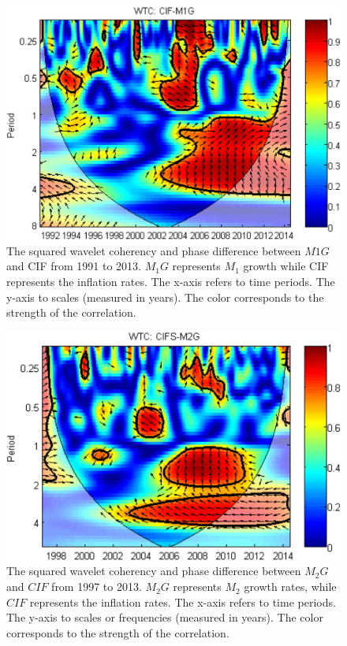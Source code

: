 \documentclass[a4paper,fleqn]{cas-sc}
\begin{document}
\begin{figure}[h]\label{fig:4}
    \centering
    \includegraphics[]{image/4.jpg}
    \caption{The squared wavelet coherency and phase difference between $M1G$ and CIF from 1991 to 2013. $M_1G$ represents $M_1$ growth while CIF represents the inflation rates. The x-axis refers to time periods. The y-axis to scales (measured in years). The color corresponds to the strength of the correlation.}
\end{figure}

\begin{figure}[h]\label{fig:5}
    \centering
    \includegraphics[]{image/5.jpg}
    \caption{The squared wavelet coherency and phase difference between $M_2G$ and $CIF$ from 1997 to 2013. $M_2G$ represents $M_2$ growth rates, while $CIF$ represents the inflation rates. The x-axis refers to time periods. The y-axis to scales or frequencies (measured in years). The color corresponds to the strength of the correlation.}
\end{figure}
\end{document}
